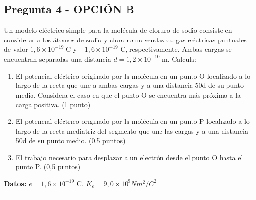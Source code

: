 \newpage

\subsection{Pregunta 4 - OPCIÓN B}
\label{subsec:4B_2006_sep}

\begin{cajaenunciado}
Un modelo eléctrico simple para la molécula de cloruro de sodio consiste en considerar a los átomos de sodio y cloro como sendas cargas eléctricas puntuales de valor $1,6\times10^{-19}$ C y $-1,6\times10^{-19}$ C, respectivamente. Ambas cargas se encuentran separadas una distancia $d=1,2\times10^{-10}$ m. Calcula: 
\begin{enumerate}
    \item El potencial eléctrico originado por la molécula en un punto O localizado a lo largo de la recta que une a ambas cargas y a una distancia 50d de su punto medio. Considera el caso en que el punto O se encuentra más próximo a la carga positiva. (1 punto) 
    \item El potencial eléctrico originado por la molécula en un punto P localizado a lo largo de la recta mediatriz del segmento que une las cargas y a una distancia 50d de su punto medio. (0,5 puntos) 
    \item El trabajo necesario para desplazar a un electrón desde el punto O hasta el punto P. (0,5 puntos) 
\end{enumerate}
\textbf{Datos:} $e=1,6\times10^{-19}$ C. $K_{e}=9,0\times10^{9}Nm^{2}/C^{2}$
\end{cajaenunciado}
\hrule

